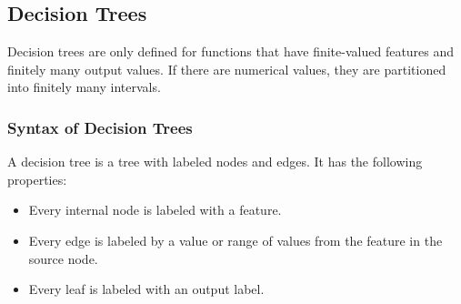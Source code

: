 \documentclass[english]{panikzettel}
\begin{document}
\subsection{Decision Trees}
\label{syntax_dec_trees}
Decision trees are only defined for functions that have finite-valued features and finitely many output values. If there are numerical values, they are partitioned into finitely many intervals.

\subsubsection{Syntax of Decision Trees}
A decision tree is a tree with labeled nodes and edges. It has the following properties:
\begin{itemize}
\item Every internal node is labeled with a feature.
\item Every edge is labeled by a value or range of values from the feature in the source node.
\item Every leaf is labeled with an output label.
\end{itemize}


%
\end{document}
